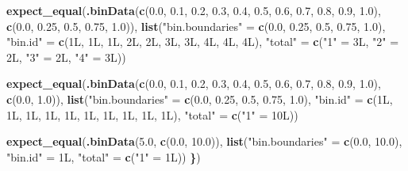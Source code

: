 \documentclass[
]{book}
\newenvironment{Shaded}{\begin{snugshade}}{\end{snugshade}}
\newcommand{\ErrorTok}[1]{\textcolor[rgb]{0.64,0.00,0.00}{\textbf{#1}}}
\newcommand{\FloatTok}[1]{\textcolor[rgb]{0.00,0.00,0.81}{#1}}
\newcommand{\FunctionTok}[1]{\textcolor[rgb]{0.13,0.29,0.53}{\textbf{#1}}}
\newcommand{\NormalTok}[1]{#1}
\newcommand{\OtherTok}[1]{\textcolor[rgb]{0.56,0.35,0.01}{#1}}
\newcommand{\StringTok}[1]{\textcolor[rgb]{0.31,0.60,0.02}{#1}}
\begin{document}
\begin{Shaded}
\begin{Highlighting}[]
  \FunctionTok{expect\_equal}\NormalTok{(}\FunctionTok{.binData}\NormalTok{(}\FunctionTok{c}\NormalTok{(}\FloatTok{0.0}\NormalTok{, }\FloatTok{0.1}\NormalTok{, }\FloatTok{0.2}\NormalTok{, }\FloatTok{0.3}\NormalTok{, }\FloatTok{0.4}\NormalTok{, }\FloatTok{0.5}\NormalTok{, }\FloatTok{0.6}\NormalTok{, }\FloatTok{0.7}\NormalTok{, }\FloatTok{0.8}\NormalTok{, }\FloatTok{0.9}\NormalTok{, }\FloatTok{1.0}\NormalTok{), }
                        \FunctionTok{c}\NormalTok{(}\FloatTok{0.0}\NormalTok{, }\FloatTok{0.25}\NormalTok{, }\FloatTok{0.5}\NormalTok{, }\FloatTok{0.75}\NormalTok{, }\FloatTok{1.0}\NormalTok{)),}
               \FunctionTok{list}\NormalTok{(}\StringTok{"bin.boundaries"} \OtherTok{=} \FunctionTok{c}\NormalTok{(}\FloatTok{0.0}\NormalTok{, }\FloatTok{0.25}\NormalTok{, }\FloatTok{0.5}\NormalTok{, }\FloatTok{0.75}\NormalTok{, }\FloatTok{1.0}\NormalTok{),}
                    \StringTok{"bin.id"}         \OtherTok{=} \FunctionTok{c}\NormalTok{(1L, 1L, 1L, 2L, 2L, 3L, 3L, 4L, 4L, 4L),}
                    \StringTok{"total"}          \OtherTok{=} \FunctionTok{c}\NormalTok{(}\StringTok{"1"} \OtherTok{=}\NormalTok{ 3L, }\StringTok{"2"} \OtherTok{=}\NormalTok{ 2L, }\StringTok{"3"} \OtherTok{=}\NormalTok{ 2L, }\StringTok{"4"} \OtherTok{=}\NormalTok{ 3L))}
               
  \FunctionTok{expect\_equal}\NormalTok{(}\FunctionTok{.binData}\NormalTok{(}\FunctionTok{c}\NormalTok{(}\FloatTok{0.0}\NormalTok{, }\FloatTok{0.1}\NormalTok{, }\FloatTok{0.2}\NormalTok{, }\FloatTok{0.3}\NormalTok{, }\FloatTok{0.4}\NormalTok{, }\FloatTok{0.5}\NormalTok{, }\FloatTok{0.6}\NormalTok{, }\FloatTok{0.7}\NormalTok{, }\FloatTok{0.8}\NormalTok{, }\FloatTok{0.9}\NormalTok{, }\FloatTok{1.0}\NormalTok{), }
                        \FunctionTok{c}\NormalTok{(}\FloatTok{0.0}\NormalTok{, }\FloatTok{1.0}\NormalTok{)),}
               \FunctionTok{list}\NormalTok{(}\StringTok{"bin.boundaries"} \OtherTok{=} \FunctionTok{c}\NormalTok{(}\FloatTok{0.0}\NormalTok{, }\FloatTok{0.25}\NormalTok{, }\FloatTok{0.5}\NormalTok{, }\FloatTok{0.75}\NormalTok{, }\FloatTok{1.0}\NormalTok{),}
                    \StringTok{"bin.id"}         \OtherTok{=} \FunctionTok{c}\NormalTok{(1L, 1L, 1L, 1L, 1L, 1L, 1L, 1L, 1L, 1L),}
                    \StringTok{"total"}          \OtherTok{=} \FunctionTok{c}\NormalTok{(}\StringTok{"1"} \OtherTok{=}\NormalTok{ 10L))}
               
  \FunctionTok{expect\_equal}\NormalTok{(}\FunctionTok{.binData}\NormalTok{(}\FloatTok{5.0}\NormalTok{, }\FunctionTok{c}\NormalTok{(}\FloatTok{0.0}\NormalTok{, }\FloatTok{10.0}\NormalTok{)),}
               \FunctionTok{list}\NormalTok{(}\StringTok{"bin.boundaries"} \OtherTok{=} \FunctionTok{c}\NormalTok{(}\FloatTok{0.0}\NormalTok{, }\FloatTok{10.0}\NormalTok{),}
                    \StringTok{"bin.id"}         \OtherTok{=}\NormalTok{ 1L,}
                    \StringTok{"total"}          \OtherTok{=} \FunctionTok{c}\NormalTok{(}\StringTok{"1"} \OtherTok{=}\NormalTok{ 1L))}
\ErrorTok{\}}\NormalTok{)}
\end{Highlighting}
\end{Shaded}
\end{document}
